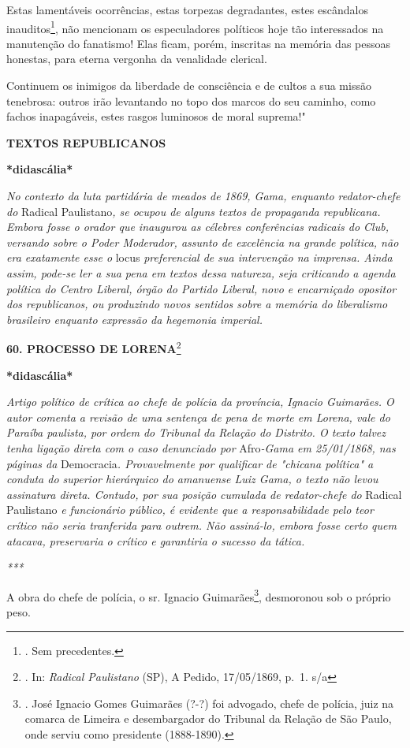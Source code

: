 Estas lamentáveis ocorrências, estas torpezas degradantes, estes
escândalos inauditos\footnote{. Sem precedentes.}, não mencionam os
especuladores políticos hoje tão interessados na manutenção do
fanatismo! Elas ficam, porém, inscritas na memória das pessoas honestas,
para eterna vergonha da venalidade clerical.

Continuem os inimigos da liberdade de consciência e de cultos a sua
missão tenebrosa: outros irão levantando no topo dos marcos do seu
caminho, como fachos inapagáveis, estes rasgos luminosos de moral
suprema!"

\textbf{TEXTOS REPUBLICANOS}

\textbf{*didascália*}

\emph{No contexto da luta partidária de meados de 1869, Gama, enquanto
redator-chefe do} Radical Paulistano\emph{, se ocupou de alguns textos
de propaganda republicana. Embora fosse o orador que inaugurou as
célebres conferências radicais do Club, versando sobre o Poder
Moderador, assunto de excelência na grande política, não era exatamente
esse o} locus \emph{preferencial de sua intervenção na imprensa. Ainda
assim, pode-se ler a sua pena em textos dessa natureza, seja criticando
a agenda política do Centro Liberal, órgão do Partido Liberal, novo e
encarniçado opositor dos republicanos, ou produzindo novos sentidos
sobre a memória do liberalismo brasileiro enquanto expressão da
hegemonia imperial.}

\textbf{60. PROCESSO DE LORENA}\footnote{. In: \emph{Radical Paulistano}
  (SP), A Pedido, 17/05/1869, p.~1. s/a}

\textbf{*didascália*}

\emph{Artigo político de crítica ao chefe de polícia da província,
Ignacio Guimarães. O autor comenta a revisão de uma sentença de pena de
morte em Lorena, vale do Paraíba paulista, por ordem do Tribunal da
Relação do Distrito. O texto talvez tenha ligação direta com o caso
denunciado por} Afro\emph{-Gama em 25/01/1868, nas páginas da}
Democracia\emph{. Provavelmente por qualificar de "chicana política" a
conduta do superior hierárquico do amanuense Luiz Gama, o texto não
levou assinatura direta. Contudo, por sua posição cumulada de
redator-chefe do} Radical Paulistano \emph{e funcionário público, é
evidente que a responsabilidade pelo teor crítico não seria tranferida
para outrem. Não assiná-lo, embora fosse certo quem atacava, preservaria
o crítico e garantiria o sucesso da tática.}

\emph{***}

A obra do chefe de polícia, o sr. Ignacio Guimarães\footnote{. José
  Ignacio Gomes Guimarães (?-?) foi advogado, chefe de polícia, juiz na
  comarca de Limeira e desembargador do Tribunal da Relação de São
  Paulo, onde serviu como presidente (1888-1890).}, desmoronou sob o
próprio peso.

